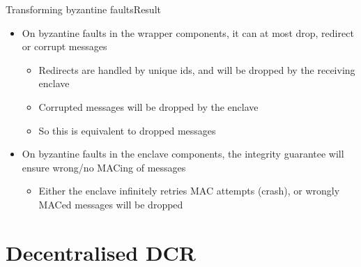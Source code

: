 \documentclass{beamer}
\begin{document}
\begin{frame}{Transforming byzantine faults}{Result}
	\begin{itemize}
		\item On byzantine faults in the wrapper components, it can at most drop, redirect or corrupt messages
		\begin{itemize}
			\item Redirects are handled by unique ids, and will be dropped by the receiving enclave
			\item Corrupted messages will be dropped by the enclave
			\item So this is equivalent to dropped messages
		\end{itemize}

	\vfill

		\item On byzantine faults in the enclave components, the integrity guarantee will ensure wrong/no MACing of messages
		\begin{itemize}
			\item Either the enclave infinitely retries MAC attempts (crash), or wrongly MACed messages will be dropped
		\end{itemize}
	\end{itemize}
\end{frame}

\section{Decentralised DCR}
\end{document}
